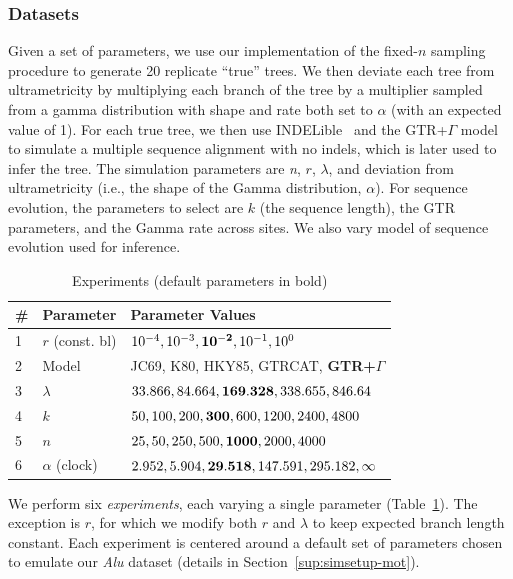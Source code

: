 \subsubsection{Datasets}
Given a set of parameters, we use our implementation of the fixed-$n$ sampling procedure to generate 20 replicate ``true'' trees. We then deviate each tree from ultrametricity by multiplying each branch of the tree by a multiplier sampled from a gamma distribution with shape and rate both set to $\alpha$ (with an expected value of 1). For each true tree, we then use INDELible~\cite{Fletcher2009} and the \gls{GTR}+$\Gamma$ model~\cite{Tavare1986} to simulate a multiple sequence alignment with no indels, which is later used to infer the tree. The simulation parameters are \textit{n}, $r$, $\lambda$, and deviation from ultrametricity (i.e., the shape of the Gamma distribution, $\alpha$). For sequence evolution, the parameters to select are $k$ (the sequence length), the \gls{GTR} parameters, and the Gamma rate across sites. We also vary model of sequence evolution used for inference.

\begin{table}[!ht] %
\caption[Experiments]{Experiments (default parameters in bold)}
\vspace{-0.25in}
\begin{center}
\begin{tabular}{|l|l|l|}
\hline
\textbf{\#}&\textbf{Parameter} & \textbf{Parameter Values}\\
\hline
1&$r$ (const. bl) & $10^{-4}, 10^{-3}, {\bf10^{-2}}, 10^{-1}, 10^{0}$\\
2& Model & JC69, K80, HKY85, GTRCAT, \textbf{GTR+$\Gamma$}\\
3&$\lambda$ & $33.866, 84.664, {\bf169.328}, 338.655, 846.64$\\
4&$k$ & $50, 100, 200, {\bf300}, 600, 1200, 2400, 4800$\\
5&$n$ & $25, 50, 250, 500, {\bf1000}, 2000, 4000$\\
6& $\alpha$ (clock) & $2.952, 5.904, {\bf29.518}, 147.591, 295.182, \infty$\\
\hline
\end{tabular}
\end{center}
\label{tab:dualbirth-experiments}
\end{table}

We perform six \textit{experiments}, each varying a single parameter (Table~\ref{tab:dualbirth-experiments}). The exception is $r$, for which we modify both $r$ and $\lambda$ to keep expected branch length constant. Each experiment is centered around a default set of parameters chosen to emulate our \textit{Alu} dataset (details in Section~\ref{sup:simsetup-mot}).

